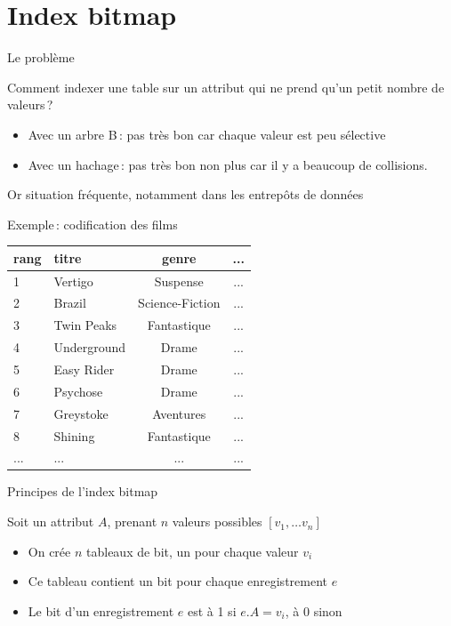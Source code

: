 

\section{Index bitmap}
\begin{frame}{Le problème}

Comment indexer une table sur un attribut
qui ne prend qu'un petit nombre de valeurs\,?
\begin{itemize}
  \item Avec un arbre B\,: pas très bon car chaque valeur
      est peu sélective
 \item Avec un hachage\,: pas très bon non plus
          car il y a beaucoup de collisions.
\end{itemize}

Or situation fréquente, notamment dans les entrepôts de données

\end{frame}
\begin{frame}{Exemple\,: codification des films}

\begin{center}
\begin{tabular}{l|l|c|c}
rang & titre & genre  & ...  \\
\hline
1 & Vertigo  & Suspense & ... \\
2 & Brazil & Science-Fiction & ... \\
3 & Twin Peaks & Fantastique & ... \\
4 & Underground & Drame & ... \\
5 & Easy Rider &  Drame & ...\\
6 & Psychose & Drame & ... \\
7 & Greystoke &  Aventures & ... \\
8 & Shining & Fantastique & ... \\
... & ... &  ... & ...\\
\hline
\end{tabular}
\end{center}

\end{frame}
\begin{frame}{Principes de l'index bitmap}

Soit un attribut $A$, prenant $n$ valeurs possibles $[v_1, \ldots v_n]$
\begin{itemize}
  \item On crée $n$ tableaux de bit, un pour chaque valeur $v_i$ 

   \item Ce tableau contient un bit pour  chaque enregistrement $e$

   \item   Le bit d'un enregistrement $e$ est à 1 si $e.A=v_i$,
                à 0 sinon
\end{itemize}

\end{frame}
